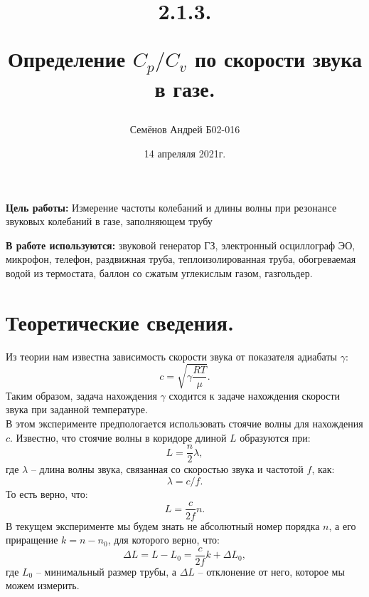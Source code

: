 \documentclass[12pt,a4paper]{article}
\begin{document}
\title{
2.1.3.

Определение $C_p/C_v$ по скорости звука в газе.
\author{Семёнов Андрей Б02-016}
}
\date{14 апреляля 2021г.}

\maketitle

\newpage


\textbf{Цель работы:} Измерение частоты колебаний и длины волны при резонансе звуковых колебаний в газе, заполняющем трубу

\textbf{В работе используются:} звуковой генератор ГЗ, электронный осциллограф ЭО, микрофон, телефон, раздвижная труба, теплоизолированная труба, обогреваемая водой из термостата, баллон со сжатым углекислым газом, газгольдер.

\section{Теоретические сведения.}
Из теории нам известна зависимость скорости звука от показателя адиабаты $\gamma$:
$$c = \sqrt{\gamma\frac{RT}{\mu}}.$$
Таким образом, задача нахождения $\gamma$ сходится к задаче нахождения скорости звука при заданной температуре.\\
В этом эксперименте предпологается использовать стоячие волны для нахождения $c$. Известно, что стоячие волны в коридоре длиной $L$ образуются при:
$$L = \frac{n}{2}\lambda,$$
где $\lambda$ -- длина волны звука, связанная со скоростью звука и частотой $f$, как:
$$\lambda = c/f.$$
То есть верно, что:
$$L = \frac{c}{2f}n.$$
В текущем эксперименте мы будем знать не абсолютный номер порядка $n$, а его приращение $k = n - n_0$, для которого верно, что:
$$\Delta L = L - L_0 = \frac{c}{2f}k + \Delta L_0,$$
где $L_0$ -- минимальный размер трубы, а $\Delta L$ -- отклонение от него, которое мы можем измерить.
\end{document}
